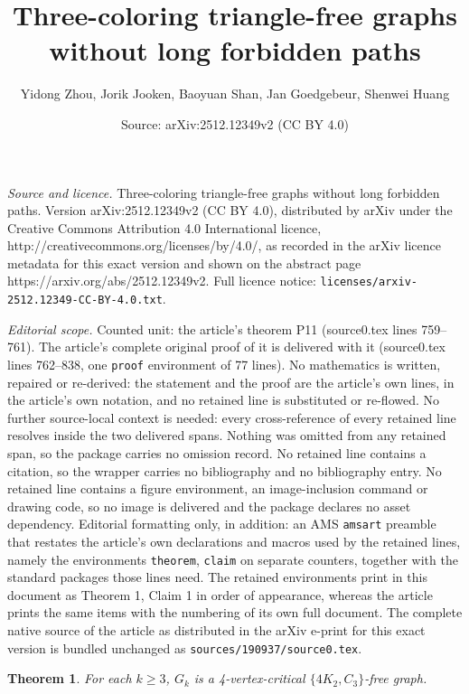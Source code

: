 \documentclass[10pt,a4paper]{amsart}
\title{Three-coloring triangle-free graphs without long forbidden paths}
\author{Yidong Zhou, Jorik Jooken, Baoyuan Shan, Jan Goedgebeur, Shenwei Huang}
\date{Source: arXiv:2512.12349v2 (CC BY 4.0)}
\newtheorem{theorem}{Theorem}
\begin{document}
\maketitle

\noindent\emph{Source and licence.} Three-coloring triangle-free graphs without long forbidden paths. Version arXiv:2512.12349v2 (CC BY 4.0), distributed by arXiv under the Creative Commons Attribution 4.0 International licence, http://creativecommons.org/licenses/by/4.0/, as recorded in the arXiv licence metadata for this exact version and shown on the abstract page https://arxiv.org/abs/2512.12349v2. Full licence notice: \texttt{licenses/arxiv-2512.12349-CC-BY-4.0.txt}.\par\smallskip

\noindent\textit{Editorial scope.} Counted unit: the article's theorem P11 (source0.tex lines 759--761). The article's complete original proof of it is delivered with it (source0.tex lines 762--838, one \texttt{proof} environment of 77 lines). No mathematics is written, repaired or re-derived: the statement and the proof are the article's own lines, in the article's own notation, and no retained line is substituted or re-flowed.  No further source-local context is needed: every cross-reference of every retained line resolves inside the two delivered spans.  Nothing was omitted from any retained span, so the package carries no omission record.  No retained line contains a citation, so the wrapper carries no bibliography and no bibliography entry.  No retained line contains a figure environment, an image-inclusion command or drawing code, so no image is delivered and the package declares no asset dependency.  Editorial formatting only, in addition: an AMS \texttt{amsart} preamble that restates the article's own declarations and macros used by the retained lines, namely the environments \texttt{theorem}, \texttt{claim} on separate counters, together with the standard packages those lines need.  The retained environments print in this document as Theorem 1, Claim 1 in order of appearance, whereas the article prints the same items with the numbering of its own full document.  The complete native source of the article as distributed in the arXiv e-print for this exact version is bundled unchanged as \texttt{sources/190937/source0.tex}.
\begin{theorem}\label{P11}
    For each $k\geq 3$, $G_k$ is a 4-vertex-critical $\{4K_2,C_3\}$-free graph. 
\end{theorem}
\end{document}
